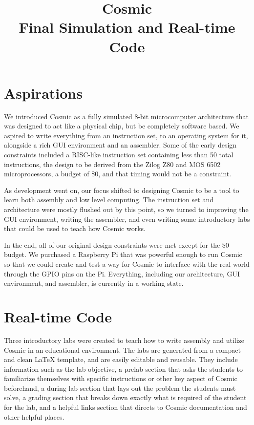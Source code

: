 \documentclass[conference]{IEEEtran}
\begin{document}
\title{
 Cosmic\\Final Simulation and Real-time Code}
\author{
\and
{}
}
\maketitle

\section{Aspirations}
We introduced Cosmic as a fully simulated 8-bit microcomputer architecture that was designed to act like a physical chip, but be completely software based. We aspired to write everything from an instruction set, to an operating system for it, alongside a rich GUI environment and an assembler. Some of the early design constraints included a RISC-like instruction set containing less than 50 total instructions, the design to be derived from the Zilog Z80 and MOS 6502 microprocessors, a budget of \$0, and that timing would not be a constraint.

As development went on, our focus shifted to designing Cosmic to be a tool to learn both assembly and low level computing. The instruction set and architecture were mostly flushed out by this point, so we turned to improving the GUI environment, writing the assembler, and even writing some introductory labs that could be used to teach how Cosmic works.

In the end, all of our original design constraints were met except for the \$0 budget. We purchased a Raspberry Pi that was powerful enough to run Cosmic so that we could create and test a way for Cosmic to interface with the real-world through the GPIO pins on the Pi. Everything, including our architecture, GUI environment, and assembler, is currently in a working state.

\section{Real-time Code}
Three introductory labs were created to teach how to write assembly and utilize Cosmic in an educational environment. The labs are generated from a compact and clean LaTeX template, and are easily editable and reusable. They include information such as the lab objective, a prelab section that asks the students to familiarize themselves with specific instructions or other key aspect of Cosmic beforehand, a during lab section that lays out the problem the students must solve, a grading section that breaks down exactly what is required of the student for the lab, and a helpful links section that directs to Cosmic documentation and other helpful places.
\end{document}
